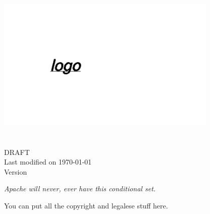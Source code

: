 \documentclass[twoside]{article}
\begin{document}
\thispagestyle{title}
\begin{center}
\includegraphics[width=300pt]{mclogo}\\
{\LARGE{\textsc{\client\ \product \\
\doctype \\
\ifDraft DRAFT \\ \fi}
Last modified on \today\ \\
Version \vers \\}}
\vspace{2in}

\ifInQTel
\begin{changemargin}{1in}{1in}
{\it Apache will never, ever have this conditional set.}
\end{changemargin}
\fi

\end{center}

\ifDraft {} \fi
{}

\pagebreak
\thispagestyle{title}
{\footnotesize You can put all the copyright and legalese stuff here.}
\pagebreak

\selectfont
\pagestyle{fancy}




\end{document}
